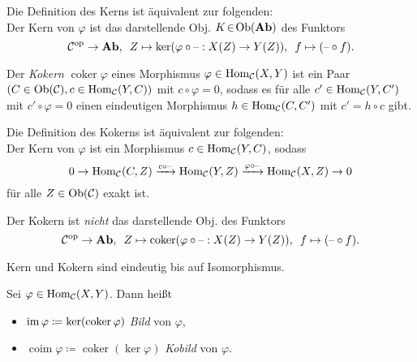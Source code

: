 \documentclass{cheat-sheet}
\DeclareMathOperator{\coker}{coker} %
\DeclareMathOperator{\coim}{coim} %
\begin{document}
\begin{bem}
  Die Definition des Kerns ist äquivalent zur folgenden: \\
  Der Kern von $\varphi$ ist das darstellende Obj. $K \!\in\! \operatorname{Ob}(\mathbf{Ab})$ des Funktors
  \[
    \mathcal{C}^{\mathrm{op}} \to \mathbf{Ab}, \enspace
    Z \mapsto \ker(\varphi \circ \text{--} : X(Z) \to Y(Z)), \enspace
    f \mapsto (\text{--} \circ f).
  \]
\end{bem}


\begin{defn}
  Der \emph{Kokern} $\coker \varphi$ eines Morphismus $\varphi \in \operatorname{Hom}_{\mathcal{C}}(X, Y)$ ist ein Paar $(C \in \operatorname{Ob}(\mathcal{C}), c \in \operatorname{Hom}_{\mathcal{C}}(Y, C))$ mit $c \circ \varphi = 0$, sodass es für alle $c' \in \operatorname{Hom}_{\mathcal{C}}(Y, C')$ mit $c' \circ \varphi = 0$ einen eindeutigen Morphismus $h \in \operatorname{Hom}_{\mathcal{C}}(C, C')$ mit $c' = h \circ c$ gibt.
\end{defn}


\begin{bem}
  Die Definition des Kokerns ist äquivalent zur folgenden: \\
  Der Kern von $\varphi$ ist ein Morphismus $c \in \operatorname{Hom}_{\mathcal{C}}(Y, C)$, sodass
  \[ 0 \to \operatorname{Hom}_{\mathcal{C}}(C, Z) \xrightarrow{c \circ \text{--}} \operatorname{Hom}_{\mathcal{C}}(Y, Z) \xrightarrow{\varphi \circ \text{--}} \operatorname{Hom}_{\mathcal{C}}(X, Z) \to 0 \]
  für alle $Z \in \operatorname{Ob}(\mathcal{C})$ exakt ist.
\end{bem}

\begin{acht}
  Der Kokern ist {\em nicht} das darstellende Obj. des Funktors
  \[
    \Cat^\op \to \AbGrp, \enspace
    Z \mapsto \coker(\varphi \circ \blank : X(Z) \to Y(Z)), \enspace
    f \mapsto (\blank \circ f).
  \]
\end{acht}

\begin{bem}
  Kern und Kokern sind eindeutig bis auf Isomorphismus.
\end{bem}

\begin{defn}
  Sei $\varphi \in \operatorname{Hom}_{\mathcal{C}}(X, Y)$. Dann heißt
  \begin{itemize}
    \item $\im \varphi \coloneqq \ker(\coker \varphi)$ \emph{Bild} von $\varphi$,
    \item $\coim \varphi \coloneqq \coker(\ker \varphi)$ \emph{Kobild} von $\varphi$.
  \end{itemize}
\end{defn}
\end{document}
